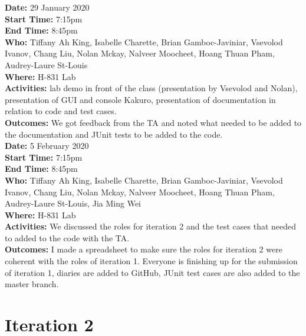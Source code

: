 \documentclass[12pt]{article}
\begin{document}
{\bf Date:} 29 January 2020 \\
{\bf Start Time:} 7:15pm\\
{\bf End Time:} 8:45pm\\
{\bf Who:} Tiffany Ah King, Isabelle Charette, Brian Gamboc-Javiniar, Vsevolod Ivanov, Chang Liu, Nolan Mckay, Nalveer Moocheet, Hoang Thuan Pham, Audrey-Laure St-Louis\\
{\bf Where:} H-831 Lab \\
{\bf Activities:} lab demo in front of the class (presentation by Vsevolod and Nolan), presentation of GUI and console Kakuro, presentation of documentation in relation to code and test cases. \\
{\bf Outcomes:} We got feedback from the TA and noted what needed to be added to the documentation and JUnit tests to be added to the code. \\

{\bf Date:} 5 February 2020 \\
{\bf Start Time:} 7:15pm\\
{\bf End Time:} 8:45pm\\
{\bf Who:} Tiffany Ah King, Isabelle Charette, Brian Gamboc-Javiniar, Vsevolod Ivanov, Chang Liu, Nolan Mckay, Nalveer Moocheet, Hoang Thuan Pham, Audrey-Laure St-Louis, Jia Ming Wei\\
{\bf Where:} H-831 Lab \\
{\bf Activities:}  We discussed the roles for iteration 2 and the test cases that needed to added to the code with the TA.\\
{\bf Outcomes:} I made a spreadsheet to make sure the roles for iteration 2 were coherent with the roles of iteration 1. Everyone is finishing up for the submission of iteration 1, diaries are added to GitHub, JUnit test cases are also added to the master branch.\\

\section{Iteration 2}
\end{document}
